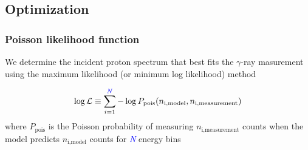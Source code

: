 \documentclass{beamer}
\begin{document}
\subsection{Optimization}
\begin{frame}
\frametitle{Poisson likelihood function}
We determine the incident proton spectrum that best fits the $\gamma$-ray masurement using the maximum likelihood (or minimum log likelihood) method

\begin{equation}
  \log\mathcal{L} \equiv \sum_{i=1}^{\textcolor{blue}{N}} -\log P_{\text{pois}}(n_{\text{i,model}}, n_{\text{i,measurement}})
\end{equation}
where $P_{\text{pois}}$ is the Poisson probability of measuring $n_{\text{i,measurement}}$ counts when the model predicts $n_{\text{i,model}}$ counts for \textit{\textcolor{blue}{N}} energy bins

\end{frame}
\end{document}
